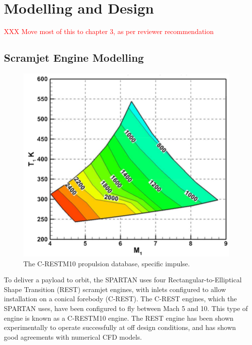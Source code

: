  





\section{Modelling and Design}

\textcolor{red}{XXX Move most of this to chapter 3, as per reviewer recommendation}

\subsection{Scramjet Engine Modelling}\label{sec:enginemodel}
\begin{figure}
	\centering
	\includegraphics[width=0.7\linewidth]{figures/2_literature-review/C-REST}
	\caption{The C-RESTM10 propulsion database, specific impulse.}
	\label{fig:C-REST}
\end{figure}
To deliver a payload to orbit, the SPARTAN uses four Rectangular-to-Elliptical Shape Transition (REST) scramjet engines, with inlets configured to allow installation on a conical forebody (C-REST). The C-REST engines, which the SPARTAN uses, have been configured to fly between Mach 5 and 10. This type of engine is known as a C-RESTM10 engine\cite{Preller2017b}. The REST engine has been shown experimentally to operate successfully at off design conditions\cite{Smart2006,Smart2009a}, and has shown good agreements with numerical CFD models\cite{Smart2009a}. 


